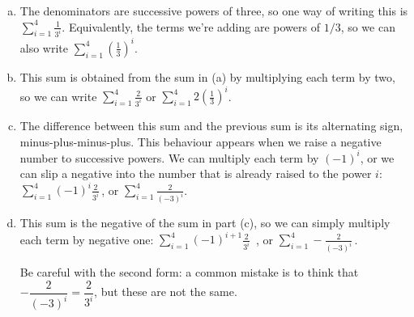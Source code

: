 \begin{solution}
\begin{enumerate}[(a)]
\item The denominators are successive powers of three, so one way of writing this is $\displaystyle\sum_{i=1}^4 \frac{1}{3^i}$. Equivalently, the terms we're adding are powers of $1/3$, so we can also write
$\displaystyle\sum_{i=1}^4 \left(\frac{1}{3}\right)^i$.
\item This sum is obtained from the sum in (a) by multiplying each term by two, so we can write $\displaystyle\sum_{i=1}^4 \frac{2}{3^i}$ or $\displaystyle\sum_{i=1}^4 2\left(\frac{1}{3}\right)^i$.
\item The difference between this sum and the previous sum is its alternating sign, minus-plus-minus-plus. This behaviour appears when we raise a negative number to successive powers. We can multiply each term by $(-1)^i$, or we can slip a negative into the number that is already raised to the power $i$: $\displaystyle\sum_{i=1}^4(-1)^i \frac{2}{3^i}$\,, or
$\displaystyle\sum_{i=1}^4  \frac{2}{(-3)^i}$.
\item This sum is the negative of the sum in part (c), so we can simply multiply each term by negative one: $\displaystyle\sum_{i=1}^4(-1)^{i+1} \frac{2}{3^i}$
\,, or $\displaystyle\sum_{i=1}^4  -\frac{2}{(-3)^i}$\,.

Be careful with the second form: a common mistake is to think that $-\dfrac{2}{(-3)^i} = \dfrac{2}{3^i}$, but these are not the same.
\end{enumerate}
\end{solution}

